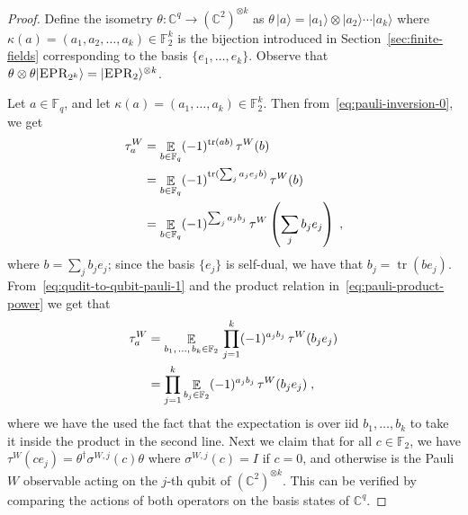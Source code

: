 \documentclass[11pt]{article}
\theoremstyle{definition}
\newcommand{\ket}[1]{|#1\rangle}
\newcommand{\Id}{\ensuremath{I}}
\newcommand{\C}{\ensuremath{\mathbb{C}}}
\newcommand{\F}{\ensuremath{\mathbb{F}}}
\newcommand{\ot}{\otimes}
\DeclareMathOperator{\tr}{tr}
\newcommand{\E}{\mathop{\mathbb{E}}\displaylimits}
\newcommand{\labelstyle}[1]{\ensuremath{\textsc{#1}}\xspace}
\newcommand{\EPR}{\labelstyle{EPR}}
\begin{document}
\begin{proof}
Define the isometry $\theta : \C^q \to (\C^2)^{\otimes k}$ as $\theta\,
  \ket{a} = \ket{a_1} \otimes \ket{ a_2} \cdots \ket{a_k}$ where $\kappa(a) = (a_1, a_2, \ldots, a_k)
  \in \F_2^k$ is the bijection introduced in Section~\ref{sec:finite-fields}
  corresponding to the basis $\{e_1,\ldots,e_k\}$. Observe that
  $\theta \otimes \theta \ket{\EPR_{2^k}} = \ket{\EPR_2}^{\ot k}$.

  Let $a \in \F_q$, and let $\kappa(a) = (a_1,\ldots,a_k) \in \F_2^k$.
  Then from~\eqref{eq:pauli-inversion-0}, we get
  \begin{equation}
    \label{eq:qudit-to-qubit-pauli-1}
    \begin{split}
      \tau^W_a
      & = \E_{b \in \F_q} (-1)^{\tr(a b)} \, \tau^W(b) \\
      & = \E_{b \in \F_q} (-1)^{\tr(\sum_j a_j e_j b)} \, \tau^W(b) \\
      & = \E_{b \in \F_q} (-1)^{\sum_j a_j b_j} \,
      \tau^W \left ( \sum_j b_j e_j \right) \;,
    \end{split}
  \end{equation}
  where $b = \sum_j b_j e_j$; since the basis $\{e_j \}$ is self-dual, we have
  that $b_j = \tr(b e_j)$. From~\eqref{eq:qudit-to-qubit-pauli-1} and
  the product relation in~\eqref{eq:pauli-product-power} we get that
  \begin{equation}
		\label{eq:qudit-to-qubit-pauli}
    \begin{split}
      \tau^W_a & = \E_{b_1,\, \ldots,\, b_k \in \F_2}\,
      \prod_{j=1}^k (-1)^{a_j b_j} \, \tau^W(b_j e_j) \\
      & = \prod_{j=1}^k \E_{b_j \in \F_2} (-1)^{a_j b_j} \, \tau^W(b_j e_j)\;,
    \end{split}
  \end{equation}
  where we have the used the fact that the expectation is over iid
  $b_1, \dots, b_k$ to take it inside the product in the second line.
  Next we claim that for all $c \in \F_2$, we have $\tau^W(c e_j) =
  \theta^\dagger \sigma^{W,j} (c) \theta$ where $\sigma^{W,j}(c) = \Id$ if $c =
  0$, and otherwise is the Pauli $W$ observable acting on the $j$-th qubit of
  $(\C^2)^{\otimes k}$. This can be verified by comparing the actions of both
  operators on the basis states of $\C^q$.
  

\end{proof}
\end{document}
